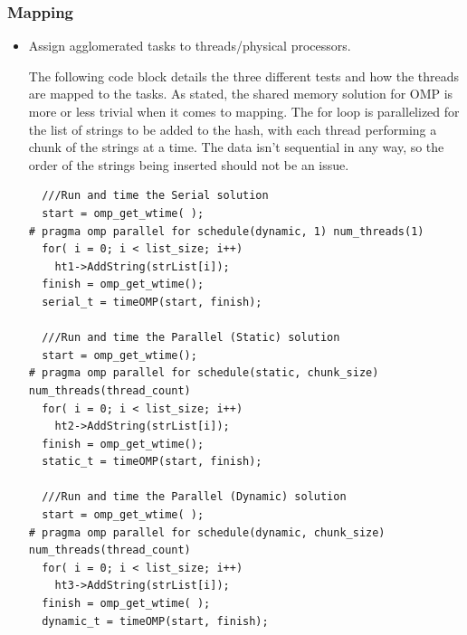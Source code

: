 \documentclass{article}
\begin{document}
\subsubsection{Mapping}
        \begin{itemize}
            \item Assign agglomerated tasks to threads/physical processors.
            
            The following code block details the three different tests and how the threads are mapped to the tasks. As stated, the 
            shared memory solution for OMP is more or less trivial when it comes to mapping. The for loop is parallelized for the 
            list of strings to be added to the hash, with each thread performing a chunk of the strings at a time. The data isn't 
            sequential in any way, so the order of the strings being inserted should not be an issue.
	    \begin{lstlisting}
  ///Run and time the Serial solution
  start = omp_get_wtime( );
# pragma omp parallel for schedule(dynamic, 1) num_threads(1)
  for( i = 0; i < list_size; i++)
    ht1->AddString(strList[i]);
  finish = omp_get_wtime();
  serial_t = timeOMP(start, finish);

  ///Run and time the Parallel (Static) solution
  start = omp_get_wtime();
# pragma omp parallel for schedule(static, chunk_size) num_threads(thread_count)
  for( i = 0; i < list_size; i++)
    ht2->AddString(strList[i]);
  finish = omp_get_wtime();
  static_t = timeOMP(start, finish);

  ///Run and time the Parallel (Dynamic) solution
  start = omp_get_wtime( );
# pragma omp parallel for schedule(dynamic, chunk_size) num_threads(thread_count) 
  for( i = 0; i < list_size; i++)
    ht3->AddString(strList[i]);
  finish = omp_get_wtime( );
  dynamic_t = timeOMP(start, finish);
	    \end{lstlisting}
        \end{itemize}
\end{document}
